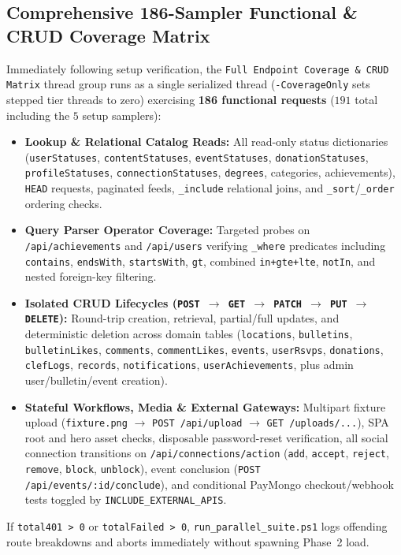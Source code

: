 \documentclass[11pt,letterpaper]{article}
\begin{document}
\subsection{Comprehensive 186-Sampler Functional \& CRUD Coverage Matrix}
Immediately following setup verification, the \texttt{Full Endpoint Coverage \& CRUD Matrix} thread group runs as a single serialized thread (\texttt{-CoverageOnly} sets stepped tier threads to zero) exercising \textbf{186 functional requests} ($191$ total including the $5$ setup samplers):
\begin{itemize}
  \item \textbf{Lookup \& Relational Catalog Reads:} All read-only status dictionaries (\texttt{userStatuses}, \texttt{contentStatuses}, \texttt{eventStatuses}, \texttt{donationStatuses}, \texttt{profileStatuses}, \texttt{connectionStatuses}, \texttt{degrees}, categories, achievements), \texttt{HEAD} requests, paginated feeds, \texttt{\_include} relational joins, and \texttt{\_sort}/\texttt{\_order} ordering checks.
  \item \textbf{Query Parser Operator Coverage:} Targeted probes on \texttt{/api/achievements} and \texttt{/api/users} verifying \texttt{\_where} predicates including \texttt{contains}, \texttt{endsWith}, \texttt{startsWith}, \texttt{gt}, combined \texttt{in+gte+lte}, \texttt{notIn}, and nested foreign-key filtering.
  \item \textbf{Isolated CRUD Lifecycles (\texttt{POST $\to$ GET $\to$ PATCH $\to$ PUT $\to$ DELETE}):} Round-trip creation, retrieval, partial/full updates, and deterministic deletion across domain tables (\texttt{locations}, \texttt{bulletins}, \texttt{bulletinLikes}, \texttt{comments}, \texttt{commentLikes}, \texttt{events}, \texttt{userRsvps}, \texttt{donations}, \texttt{clefLogs}, \texttt{records}, \texttt{notifications}, \texttt{userAchievements}, plus admin user/bulletin/event creation).
  \item \textbf{Stateful Workflows, Media \& External Gateways:} Multipart fixture upload (\texttt{fixture.png} $\to$ \texttt{POST /api/upload} $\to$ \texttt{GET /uploads/...}), SPA root and hero asset checks, disposable password-reset verification, all social connection transitions on \texttt{/api/connections/action} (\texttt{add}, \texttt{accept}, \texttt{reject}, \texttt{remove}, \texttt{block}, \texttt{unblock}), event conclusion (\texttt{POST /api/events/:id/conclude}), and conditional PayMongo checkout/webhook tests toggled by \texttt{INCLUDE\_EXTERNAL\_APIS}.
\end{itemize}
If \texttt{total401 > 0} or \texttt{totalFailed > 0}, \texttt{run\_parallel\_suite.ps1} logs offending route breakdowns and aborts immediately without spawning Phase~2 load.
\end{document}
